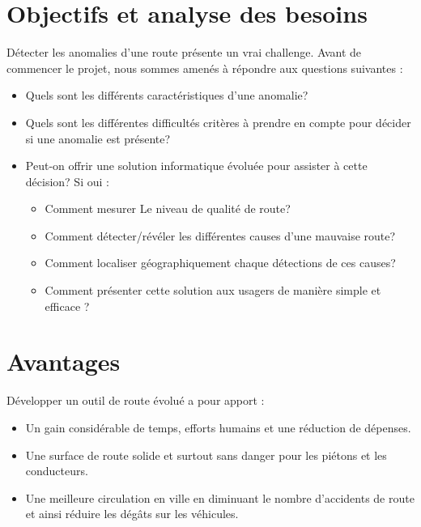 \section{Objectifs et analyse des besoins}

Détecter les anomalies d'une route présente un vrai challenge. Avant de commencer le projet,  
 nous sommes amenés à répondre aux questions suivantes :
 \renewcommand{\labelitemi}{$\bullet$}
\begin{itemize}
  \item Quels sont les différents caractéristiques d'une anomalie?
  \item Quels sont les différentes difficultés critères à prendre en compte pour décider si une anomalie est présente?
	\item Peut-on offrir une solution informatique évoluée pour assister à cette décision? Si oui : 
        
        \begin{itemize}
            \item Comment mesurer Le niveau de qualité de route?
            \item Comment détecter/révéler les différentes causes d'une mauvaise route?
	      	  \item Comment localiser géographiquement chaque détections de ces causes?
	      	  \item Comment présenter cette solution aux usagers de manière simple et efficace ?
	      \end{itemize}
\end{itemize}

   \section{Avantages}
  Développer un outil de route évolué a pour apport :
  \renewcommand{\labelitemi}{$\bullet$}
    \begin{itemize}
	  \item Un gain considérable de temps, efforts humains et une réduction de dépenses.
    \item Une surface de route solide et surtout sans danger pour les piétons et les conducteurs.
    \item Une meilleure circulation en ville en diminuant le nombre d'accidents de route et ainsi réduire les dégâts sur les véhicules.
    \end{itemize}



